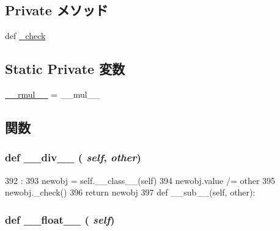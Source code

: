 \subsection*{Private メソッド}
\begin{DoxyCompactItemize}
\item 
def \hyperlink{classm5_1_1params_1_1NumericParamValue_a5c5703e7ec69bc87b19ba3165760ea36}{\_\-check}
\end{DoxyCompactItemize}
\subsection*{Static Private 変数}
\begin{DoxyCompactItemize}
\item 
\hyperlink{classm5_1_1params_1_1NumericParamValue_a0d6f9f52e4ec8af916d462d238cd25b1}{\_\-\_\-rmul\_\-\_\-} = \_\-\_\-mul\_\-\_\-
\end{DoxyCompactItemize}


\subsection{関数}
\hypertarget{classm5_1_1params_1_1NumericParamValue_ac3c5c39796d9cc1889749840f456b3e5}{
\subsubsection[{\_\-\_\-div\_\-\_\-}]{\setlength{\rightskip}{0pt plus 5cm}def \_\-\_\-div\_\-\_\- ( {\em self}, \/   {\em other})}}
\label{classm5_1_1params_1_1NumericParamValue_ac3c5c39796d9cc1889749840f456b3e5}



\begin{DoxyCode}
392                             :
393         newobj = self.__class__(self)
394         newobj.value /= other
395         newobj._check()
396         return newobj
397 
    def __sub__(self, other):
\end{DoxyCode}
\hypertarget{classm5_1_1params_1_1NumericParamValue_aa9419090a59d0dc1a40065e76ab0baf9}{
\subsubsection[{\_\-\_\-float\_\-\_\-}]{\setlength{\rightskip}{0pt plus 5cm}def \_\-\_\-float\_\-\_\- ( {\em self})}}
\label{classm5_1_1params_1_1NumericParamValue_aa9419090a59d0dc1a40065e76ab0baf9}



